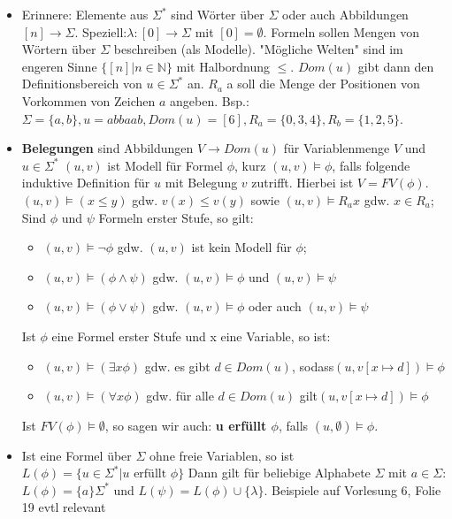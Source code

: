 \documentclass[12pt, a4paper]{article}
\begin{document}
	\begin{itemize}
		
		\item Erinnere: Elemente aus $\Sigma^{*}$ sind Wörter über $\Sigma$ oder auch Abbildungen $[n]\rightarrow\Sigma$. Speziell:$\lambda:[0]\rightarrow\Sigma$ mit $[0]=\emptyset$.
			\subitem Formeln sollen Mengen von Wörtern über $\Sigma$ beschreiben (als Modelle).
			\subitem "Mögliche Welten" sind im engeren Sinne $\{[n]|n\in\mathbb{N}\}$ mit Halbordnung $\leq$.
			\subitem $Dom(u)$ gibt dann den Definitionsbereich von $u\in\Sigma^{*}$ an.
			\subitem $R_{a}$ a soll die Menge der Positionen von Vorkommen von Zeichen $a$ angeben.
			\subitem Bsp.: $ \Sigma=\{a, b\}, u=abbaab, Dom(u)=[6], R_{a}=\{0,3,4\}, R_{b}=\{1,2,5\}$.
		
		\item \textbf{Belegungen} sind Abbildungen $V\rightarrow Dom(u)$ für Variablenmenge $V$ und $u\in\Sigma^{*}$
			\subitem $(u,v)$ ist Modell für Formel $\phi$, kurz $(u,v)\vDash\phi$, falls folgende induktive Definition für $u$ mit Belegung $v$ zutrifft. Hierbei ist $V=FV(\phi)$.
			\subitem $(u,v)\vDash(x\leq y)$ gdw. $v(x)\leq v(y)$ sowie $(u,v)\vDash R_{a}x$ gdw. $x\in R_{a}$;
			\subitem Sind $\phi$ und $\psi$ Formeln erster Stufe, so gilt:
			\begin{itemize}
				\item $(u,v)\vDash\neg\phi$ gdw. $(u,v)$ ist kein Modell für $\phi$;
				\item $(u,v)\vDash(\phi\wedge\psi)$ gdw. $(u,v)\vDash\phi$ und $(u,v)\vDash\psi$
				\item $(u,v)\vDash(\phi\vee\psi)$ gdw. $(u,v)\vDash\phi$ oder auch $(u,v)\vDash\psi$
			\end{itemize}
			
			\subitem Ist $\phi$ eine Formel erster Stufe und x eine Variable, so ist:
			\begin{itemize}
				\item $(u,v)\vDash(\exists x\phi)$ gdw. es gibt $d\in Dom(u)$, sodass$ (u,v[x\mapsto d])\vDash\phi$
				\item $(u,v)\vDash(\forall x\phi)$ gdw. für alle $d\in Dom(u)$ gilt$ (u,v[x\mapsto d])\vDash\phi$
			\end{itemize}
			\subitem Ist $FV(\phi)\vDash\emptyset$, so sagen wir auch: \textbf{u erfüllt $\phi$}, falls $(u,\emptyset)\vDash\phi$.
			
		\item Ist eine Formel über $\Sigma$ ohne freie Variablen, so ist $L(\phi)=\{u\in\Sigma^{*}|u\text{ erfüllt }\phi\}$
			\subitem Dann gilt für beliebige Alphabete $\Sigma$ mit $a\in\Sigma$: $L(\phi)=\{a\}\Sigma^{*}$ und $L(\psi)=L(\phi)\cup\{\lambda\}.$
			\subitem Beispiele auf Vorlesung 6, Folie 19 evtl relevant
		

\end{itemize}
\end{document}

